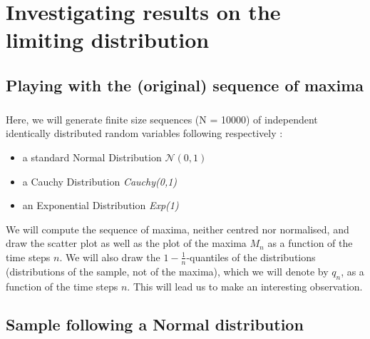 \chapter{Investigating results on the limiting distribution}
\section{Playing with the (original) sequence of maxima}
\paragraph{}
Here, we will generate finite size sequences (N = 10000) of independent identically distributed random variables following respectively :
\begin{itemize}
	\item a standard Normal Distribution $\mathcal{N}(0,1)$
	\item a Cauchy Distribution \textit{Cauchy(0,1)}
	\item an Exponential Distribution \textit{Exp(1)}
\end{itemize}
We will compute the sequence of maxima, neither centred nor normalised, and draw the scatter plot as well as the plot of the maxima  $M_n$ as a function of the time steps $n$.
We will also draw the $1 - \frac{1}{n}$-quantiles of the distributions (distributions of the sample, not of the maxima), which we will denote by $q_n$, as a function of the time steps $n$. This will lead us to make an interesting observation.
\section{Sample following a Normal distribution}
